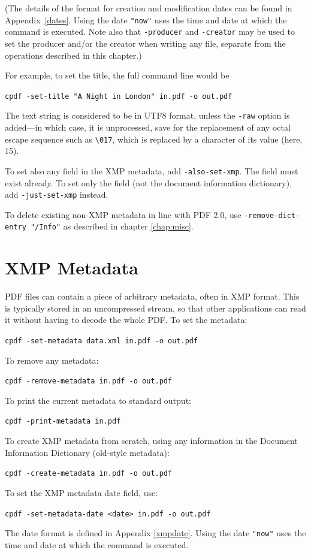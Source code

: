 \documentclass{book}
\begin{document}
  \noindent (The details of the format for creation and modification dates can be found
in Appendix~\ref{dates}. Using the date \texttt{"now"} uses the time and date
at which the command is executed. Note also that \texttt{-producer} and \texttt{-creator} may be used to set the producer and/or the creator when writing any file, separate from the operations described in this chapter.)
  
  \vspace{2mm}
  For example, to set the title, the full command line would be
  \begin{framed}
    \noindent\small\verb!cpdf -set-title "A Night in London" in.pdf -o out.pdf!
  \end{framed}
\noindent The text string is considered to be in UTF8 format, unless the \texttt{-raw}
option is added---in which case, it is unprocessed, save for the replacement of any octal escape sequence such as \texttt{\textbackslash 017}, which is replaced by a character of its value (here, 15).

To set also any field in the XMP metadata, add \texttt{-also-set-xmp}. The field must exist already. To set only the field (not the document information dictionary), add \texttt{-just-set-xmp} instead.

To delete existing non-XMP metadata in line with PDF 2.0, use \texttt{-remove-dict-entry "/Info"} as described in chapter \ref{chap:misc}.

  \section{XMP Metadata}
  PDF files can contain a piece of arbitrary metadata, often in XMP format.
This is typically stored in an uncompressed stream, so that other applications
can read it without having to decode the whole PDF. To set the metadata:
  \begin{framed}
    \noindent\small\verb!cpdf -set-metadata data.xml in.pdf -o out.pdf!
  \end{framed}
  \noindent To remove any metadata:
  \begin{framed}
    \noindent\small\verb!cpdf -remove-metadata in.pdf -o out.pdf!
  \end{framed}
  \noindent To print the current metadata to standard output:
  \begin{framed}
    \noindent\small\verb!cpdf -print-metadata in.pdf!
  \end{framed}
  \noindent To create XMP metadata from scratch, using any information in the Document Information Dictionary (old-style metadata):
  \begin{framed}
    \noindent\small\verb!cpdf -create-metadata in.pdf -o out.pdf!
  \end{framed}
  \noindent To set the XMP metadata date field, use:
  \begin{framed}
    \noindent\small\verb!cpdf -set-metadata-date <date> in.pdf -o out.pdf!
  \end{framed}
\noindent The date format is defined in Appendix \ref{xmpdate}. Using the date \texttt{"now"} uses the time and date
at which the command is executed.
\end{document}
